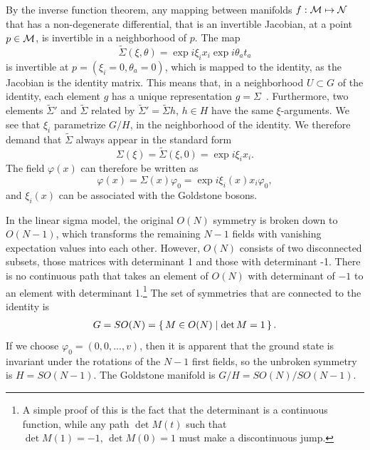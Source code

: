 By the inverse function theorem, any mapping between manifolds $f: \mathcal{M} \mapsto \mathcal{N}$ that has a non-degenerate differential, that is an invertible Jacobian, at a point $p \in \mathcal{M}$, is invertible in a neighborhood of $p$.
The map
\begin{equation}
    \tilde \Sigma(\xi, \theta) = \exp{i \xi_i x_i} \exp{i \theta_a t_a}
\end{equation}
is invertible at $p = (\xi_i = 0, \theta_a = 0)$, which is mapped to the identity, as the Jacobian is the identity matrix.
This means that, in a neighborhood $U \subset G$ of the identity, each element $g$ has a unique representation $g = \Sigma$~\cite{smooth_manifolds}.
Furthermore, two elements $\tilde \Sigma'$ and $\tilde \Sigma$ related by $\tilde \Sigma' = \tilde \Sigma h$, $h \in H$ have the same $\xi$-arguments.
We see that $\xi_i$ parametrize $G/H$, in the neighborhood of the identity.
We therefore demand that $\tilde \Sigma$ always appear in the standard form
\begin{equation}
    \Sigma(\xi) = \tilde \Sigma(\xi, 0) = \exp{i \xi_i x_i}.
\end{equation}
The field $\varphi(x)$ can therefore be written as
\begin{equation}
    \varphi(x) = \Sigma(x) \varphi_0 = \exp{i \xi_i(x) x_i} \varphi_0,
\end{equation}
and $\xi_i(x)$ can be associated with the Goldstone bosons.

In the linear sigma model, the original $O(N)$ symmetry is broken down to $O(N-1)$, which transforms the remaining $N-1$ fields with vanishing expectation values into each other.
However, $O(N)$ consists of two disconnected subsets, those matrices with determinant 1 and those with determinant -1.
There is no continuous path that takes an element of $O(N)$ with determinant of $-1$ to an element with determinant 1.\footnote{A simple proof of this is the fact that the determinant is a continuous function, while any path $\det M(t)$ such that $\det M(1) = -1,\, \det M(0) = 1$ must make a discontinuous jump.}
The set of symmetries that are connected to the identity is
\begin{eqnarray}
    G = SO(N) = \left\{\, M \in O(N) \mid  \det M = 1 \,\right\}.
\end{eqnarray}
If we choose $\varphi_0 = (0, 0, ..., v)$, then it is apparent that the ground state is invariant under the rotations of the $N-1$ first fields, so the unbroken symmetry is  $H = SO(N-1)$.
The Goldstone manifold is $G/H = SO(N) / SO(N-1)$.

